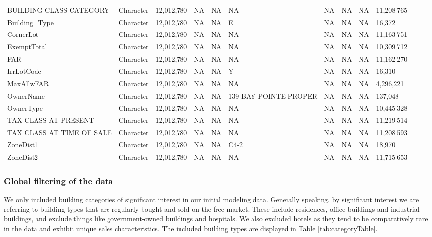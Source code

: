 \documentclass[12pt,]{article}
\begin{document}
\begin{table}
{\begin{tabular}[t]{llllllllll}
\addlinespace
BUILDING CLASS CATEGORY & Character & 12,012,780 & NA & NA & NA & NA & NA & NA & 11,208,765\\
Building\_Type & Character & 12,012,780 & NA & NA & E & NA & NA & NA & 16,372\\
CornerLot & Character & 12,012,780 & NA & NA & NA & NA & NA & NA & 11,163,751\\
ExemptTotal & Character & 12,012,780 & NA & NA & NA & NA & NA & NA & 10,309,712\\
FAR & Character & 12,012,780 & NA & NA & NA & NA & NA & NA & 11,162,270\\
\addlinespace
IrrLotCode & Character & 12,012,780 & NA & NA & Y & NA & NA & NA & 16,310\\
MaxAllwFAR & Character & 12,012,780 & NA & NA & NA & NA & NA & NA & 4,296,221\\
OwnerName & Character & 12,012,780 & NA & NA & 139 BAY POINTE PROPER & NA & NA & NA & 137,048\\
OwnerType & Character & 12,012,780 & NA & NA & NA & NA & NA & NA & 10,445,328\\
TAX CLASS AT PRESENT & Character & 12,012,780 & NA & NA & NA & NA & NA & NA & 11,219,514\\
\addlinespace
TAX CLASS AT TIME OF SALE & Character & 12,012,780 & NA & NA & NA & NA & NA & NA & 11,208,593\\
ZoneDist1 & Character & 12,012,780 & NA & NA & C4-2 & NA & NA & NA & 18,970\\
ZoneDist2 & Character & 12,012,780 & NA & NA & NA & NA & NA & NA & 11,715,653\\
\bottomrule
\end{tabular}}
\end{table}

\hypertarget{global-filtering-of-the-data}{%
\subsubsection{Global filtering of the
data}\label{global-filtering-of-the-data}}

We only included building categories of significant interest in our
initial modeling data. Generally speaking, by significant interest we
are referring to building types that are regularly bought and sold on
the free market. These include residences, office buildings and
industrial buildings, and exclude things like government-owned buildings
and hospitals. We also excluded hotels as they tend to be comparatively
rare in the data and exhibit unique sales characteristics. The included
building types are displayed in Table \ref{tab:categoryTable}.
\end{document}
